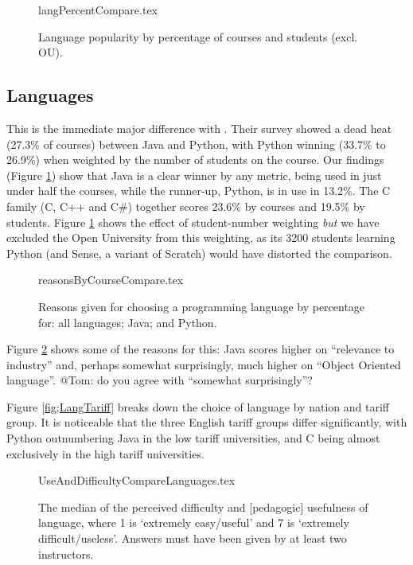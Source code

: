 \documentclass{sig-alternate}
\begin{document}
\begin{figure}
\begin{center}
{langPercentCompare.tex}
\end{center}\vskip-12pt
\caption{Language popularity by percentage of courses and students (excl. OU).\label{fig:lang}}
\end{figure}
\subsection{Languages}
This is the immediate major difference with \cite{mason+cooper:2014}. Their survey showed a dead heat (27.3\% of courses) between Java and Python, with Python winning (33.7\% to 26.9\%) when weighted by the number of students on the course.  Our findings  (Figure \ref{fig:lang}) show that Java is a clear winner by any metric, being used in just under half the courses, while the runner-up, Python, is in use in  13.2\%. The C family (C, C++ and C\#) together scores 23.6\% by courses and 19.5\% by students. Figure \ref{fig:lang} shows the effect of student-number weighting \emph{but} we have excluded the Open University from this weighting, as its 3200 students learning Python (and Sense, a variant of Scratch) would have distorted the comparison.

\begin{figure}
\begin{center}
{reasonsByCourseCompare.tex}
\end{center}
\caption{Reasons given for choosing a programming language by percentage for: all languages; Java; and Python.\label{fig:reasons}}
\end{figure}
\par
Figure \ref{fig:reasons} shows some of the reasons for this: Java scores higher on ``relevance to industry'' and, perhaps somewhat surprisingly, much higher on ``Object Oriented language''.  @Tom: do you agree with ``somewhat surprisingly''?

Figure \ref{fig;LangTariff} breaks down the choice of language by nation and tariff group.  It is noticeable that the three English tariff groups differ significantly, with Python outnumbering Java in the low tariff universities, and C being almost exclusively in the high tariff universities.

\begin{figure}
\begin{center}
{UseAndDifficultyCompareLanguages.tex}
\end{center}\vskip-18pt
\caption{The median of the perceived difficulty and [pedagogic] usefulness of language, where 1 is `extremely easy/useful' and 7 is `extremely difficult/useless'.  Answers must have been given by at least two instructors.\label{fig:utility}}
\end{figure}
\end{document}
